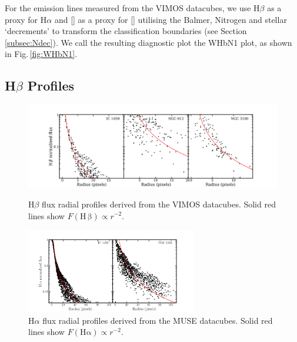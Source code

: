 		For the emission lines measured from the VIMOS datacubes, we use H$\beta$ as a proxy for H$\alpha$ and [] as a proxy for [] utilising the Balmer, Nitrogen and stellar `decrements' to transform the classification boundaries (see Section \ref{subsec:Ndec}). We call the resulting diagnostic plot the WHbN1 plot, as shown in Fig.\,\ref{fig:WHbN1}.

		



	\subsection{H$\beta$ Profiles}
		\label{subsec:Hb}

		\begin{figure}
			\centering
			\includegraphics[width=\textwidth]{chapter5/vimos/Hbeta_profile.png}
			\caption[VIMOS H$\beta$ radial profiles]{H$\beta$ flux radial profiles derived from the VIMOS datacubes. Solid red lines show $F(\mathrm{H\,\beta}) \propto r^{-2}$.\label{fig:Hb_profile_VIMOS}} 
			

			\includegraphics[width=0.66\textwidth]{chapter5/muse/Halpha_profile.png}
			\caption[MUSE H$\alpha$ radial profiles]{H$\alpha$ flux radial profiles derived from the MUSE datacubes. Solid red lines show $F(\mathrm{H\alpha}) \propto r^{-2}$.\label{fig:Ha_profile_MUSE}} 
			
		\end{figure}
		
